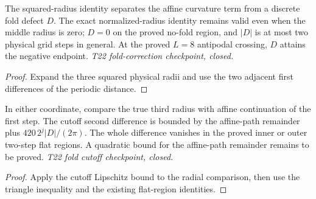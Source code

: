 \begin{lemma}
  \label{lem:normalized-radius-fold-correction}
  \leanok
  The squared-radius identity separates the affine curvature term from a
  discrete fold defect $D$. The exact normalized-radius identity remains
  valid even when the middle radius is zero; $D=0$ on the proved no-fold
  region, and $|D|$ is at most two physical grid steps in general. At the
  proved $L=8$ antipodal crossing, $D$ attains the negative endpoint.
  \emph{T22 fold-correction checkpoint, closed.}
\end{lemma}
\begin{proof}\leanok
  Expand the three squared physical radii and use the two adjacent
  first differences of the periodic distance.
\end{proof}

\begin{lemma}
  \label{lem:normalized-cutoff-fold-bound}
  \leanok
  In either coordinate, compare the true third radius with affine
  continuation of the first step. The cutoff second difference is bounded
  by the affine-path remainder plus $420\,2^j|D|/(2\pi)$. The whole
  difference vanishes in the proved inner or outer two-step flat regions.
  A quadratic bound for the affine-path remainder remains to be proved.
  \emph{T22 fold cutoff checkpoint, closed.}
\end{lemma}
\begin{proof}\leanok
  Apply the cutoff Lipschitz bound to the radial comparison, then use the
  triangle inequality and the existing flat-region identities.
\end{proof}

